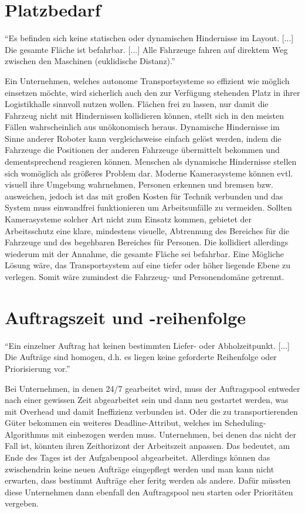 \documentclass[ngerman]{tudscrreprt}
\begin{document}
\section{Platzbedarf}
\begin{displayquote}
    ``Es befinden sich keine statischen oder dynamischen Hindernisse im Layout. [...] Die gesamte Fläche ist befahrbar. [...] Alle Fahrzeuge fahren auf direktem Weg zwischen den Maschinen (euklidische Distanz).'' \cite{aufgabenstellung}
\end{displayquote}
%
Ein Unternehmen, welches autonome Transportsysteme so effizient wie möglich einsetzen möchte, wird sicherlich auch den zur Verfügung stehenden Platz in ihrer Logistikhalle sinnvoll nutzen wollen. Flächen frei zu lassen, nur damit die Fahrzeug nicht mit Hindernissen kollidieren können, stellt sich in den meisten Fällen wahrscheinlich aus unökonomisch heraus. Dynamische Hindernisse im Sinne anderer Roboter kann vergleichsweise einfach gelöst werden, indem die Fahrzeuge die Positionen der anderen Fahrzeuge übermittelt bekommen und dementsprechend reagieren können. Menschen als dynamische Hindernisse stellen sich womöglich als größeres Problem dar. Moderne Kamerasysteme können evtl. visuell ihre Umgebung wahrnehmen, Personen erkennen und bremsen bzw. ausweichen, jedoch ist das mit großen Kosten für Technik verbunden und das System muss einwandfrei funktionieren um Arbeitsunfälle zu vermeiden. Sollten Kamerasysteme solcher Art nicht zum Einsatz kommen, gebietet der Arbeitsschutz eine klare, mindestens visuelle, Abtrennung des Bereiches für die Fahrzeuge und des begehbaren Bereiches für Personen. Die kollidiert allerdings wiederum mit der Annahme, die gesamte Fläche sei befahrbar. Eine Mögliche Lösung wäre, das Transportsystem auf eine tiefer oder höher liegende Ebene zu verlegen. Somit wäre zumindest die Fahrzeug- und Personendomäne getrennt.

\section{Auftragszeit und -reihenfolge}
\begin{displayquote}
    ``Ein einzelner Auftrag hat keinen bestimmten Liefer- oder Abholzeitpunkt. [...] Die Aufträge sind homogen, d.h. es liegen keine geforderte Reihenfolge oder Priorisierung vor.'' \cite{aufgabenstellung}
\end{displayquote}
%
Bei Unternehmen, in denen 24/7 gearbeitet wird, muss der Auftragspool entweder nach einer gewissen Zeit abgearbeitet sein und dann neu gestartet werden, was mit Overhead und damit Ineffizienz verbunden ist. Oder die zu transportierenden Güter bekommen ein weiteres Deadline-Attribut, welches im Scheduling-Algorithmus mit einbezogen werden muss. Unternehmen, bei denen das nicht der Fall ist, könnten ihren Zeithorizont der Arbeitszeit anpassen. Das bedeutet, am Ende des Tages ist der Aufgabenpool abgearbeitet. Allerdings können das zwischendrin keine neuen Aufträge eingepflegt werden und man kann nicht erwarten, dass bestimmt Aufträge eher feritg werden als andere. Dafür müssten diese Unternehmen dann ebenfall den Auftragspool neu starten oder Prioritäten vergeben.
\end{document}
